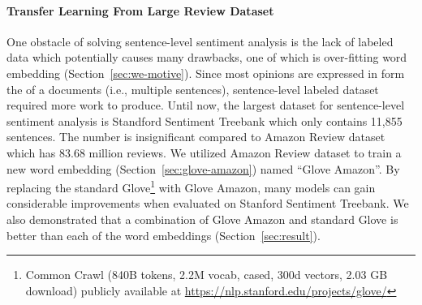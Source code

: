 \paragraph{Transfer Learning From Large Review Dataset} One obstacle of solving sentence-level sentiment analysis is the lack of labeled data which potentially causes many drawbacks, one of which is over-fitting word embedding (Section~\ref{sec:we-motive}).
Since most opinions are expressed in form the of  a documents (i.e., multiple sentences), sentence-level labeled dataset required more work to produce.
Until now, the largest dataset for sentence-level sentiment analysis is Standford Sentiment Treebank which only contains 11,855 sentences.
The number is insignificant compared to Amazon Review dataset which has 83.68 million reviews.
We utilized Amazon Review dataset to train a new word embedding (Section~\ref{sec:glove-amazon}) named ``Glove Amazon''.
By replacing the standard Glove\footnote{Common Crawl (840B tokens, 2.2M vocab, cased, 300d vectors, 2.03 GB download) publicly available at \url{https://nlp.stanford.edu/projects/glove/}} with Glove Amazon, many models can gain considerable improvements when evaluated on Stanford Sentiment Treebank.
We also demonstrated that a combination of Glove Amazon and standard Glove is better than each of the word embeddings (Section~\ref{sec:result}).



